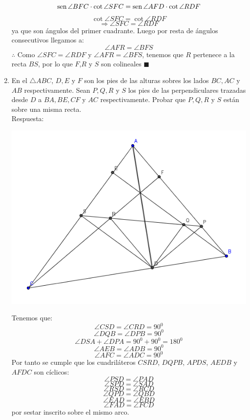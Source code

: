 \documentclass{book}
\newcommand{\sen}{\mathop{\rm sen}\nolimits} %
\begin{document}
\begin{enumerate}
        $$\sen {\angle BFC}\cdot\cot{\angle SFC}=\sen {\angle AFD}\cdot\cot{\angle RDF}$$
        $$\cot{\angle SFC}=\cot{\angle RDF}$$
        $$\Rightarrow\angle SFC=\angle RDF$$
        ya que son ángulos del primer cuadrante. Luego por resta de ángulos consecutivos llegamos a:
        $$\angle AFR=\angle BFS$$
        $\therefore$ Como $\angle SFC=\angle RDF$ y $\angle AFR=\angle BFS$, tenemos que $R$ pertenece a la recta $BS$, por lo que $F$,$R$ y $S$ son colineales  $\blacksquare$\\
        \item En el $\triangle ABC$, $D ,E$ y $F$ son los pies de las alturas sobres los lados $BC,AC$ y $AB$ respectivamente. Sean $P,Q,R$ y $S$ los pies de las perpendiculares trazadas desde $D$ a $BA, BE, CF$ y $AC$ respectivamente. Probar que $P, Q, R$ y $S$ están sobre una misma recta.\\
        Respuesta:
        \begin{center}
            \includegraphics[scale=1]{imagenes/Geometria/16.png}
        \end{center}
        Tenemos que:
        $$\angle CSD=\angle CRD=90^0$$
        $$\angle DQB=\angle DPB=90^0$$
        $$\angle DSA+\angle DPA=90^0+90^0=180^0$$
        $$\angle AEB=\angle ADB=90^0$$
        $$\angle AFC=\angle ADC=90^ 0$$
        Por tanto se cumple que los cuadriláteros $CSRD$, $DQPB$, $APDS$, $AEDB$ y $AFDC$ son cíclicos:
        $$\angle PSD=\angle PAD$$
        $$\angle SPD=\angle SAD$$
        $$\angle RSD=\angle RCD$$
        $$\angle QPD=\angle QBD$$
        $$\angle EAD=\angle EBD$$
        $$\angle FAD=\angle FCD$$
        por sestar inscrito sobre el mismo arco.

\end{enumerate}
\end{document}
